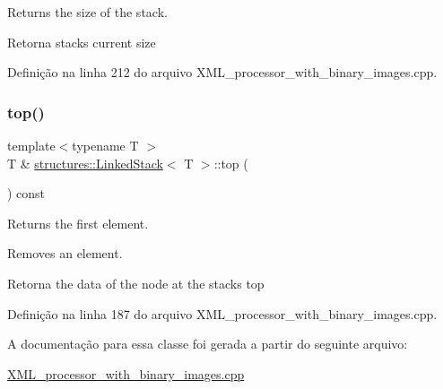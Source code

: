 Returns the size of the stack. 

\begin{DoxyReturn}{Retorna}
stack\textquotesingle{}s current size 
\end{DoxyReturn}


Definição na linha 212 do arquivo X\+M\+L\+\_\+processor\+\_\+with\+\_\+binary\+\_\+images.\+cpp.


\begin{DoxyCode}{0}

\end{DoxyCode}
\mbox{\label{classstructures_1_1LinkedStack_a14ab6e3507dd1206a87bba8c57e1733f}} 
\subsubsection{\texorpdfstring{top()}{top()}}
{\footnotesize\ttfamily template$<$typename T $>$ \\
T \& \mbox{\hyperlink{classstructures_1_1LinkedStack}{structures\+::\+Linked\+Stack}}$<$ T $>$\+::top (\begin{DoxyParamCaption}{ }\end{DoxyParamCaption}) const}



Returns the first element. 

Removes an element.

\begin{DoxyReturn}{Retorna}
the data of the node at the stack\textquotesingle{}s top 
\end{DoxyReturn}


Definição na linha 187 do arquivo X\+M\+L\+\_\+processor\+\_\+with\+\_\+binary\+\_\+images.\+cpp.


\begin{DoxyCode}{0}

\end{DoxyCode}


A documentação para essa classe foi gerada a partir do seguinte arquivo\+:\begin{DoxyCompactItemize}
\item 
\mbox{\hyperlink{XML__processor__with__binary__images_8cpp}{X\+M\+L\+\_\+processor\+\_\+with\+\_\+binary\+\_\+images.\+cpp}}\end{DoxyCompactItemize}
